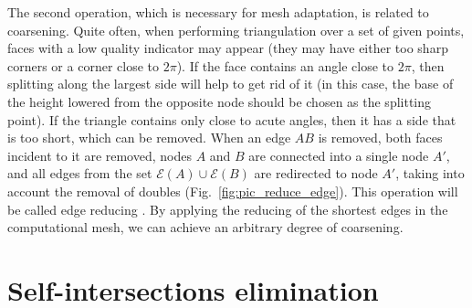 \documentclass[
11pt,%
tightenlines,%
twoside,%
onecolumn,%
nofloats,%
nobibnotes,%
nofootinbib,%
superscriptaddress,%
noshowpacs,%
centertags]%
{revtex4-2}
\begin{document}
The second operation, which is necessary for mesh adaptation, is related to coarsening.
Quite often, when performing triangulation over a set of given points, faces with a low quality indicator may appear (they may have either too sharp corners or a corner close to $2 \pi$).
If the face contains an angle close to $2 \pi$, then splitting along the largest side will help to get rid of it (in this case, the base of the height lowered from the opposite node should be chosen as the splitting point).
If the triangle contains only close to acute angles, then it has a side that is too short, which can be removed.
When an edge $AB$ is removed, both faces incident to it are removed, nodes $A$ and $B$ are connected into a single node $A'$, and all edges from the set $\mathscr{E}(A) \cup \mathscr{E} (B)$ are redirected to node $A'$, taking into account the removal of doubles (Fig.~\ref{fig:pic_reduce_edge}).
This operation will be called edge reducing \cite{Panchal}.
By applying the reducing of the shortest edges in the computational mesh, we can achieve an arbitrary degree of coarsening.


\section{Self-intersections elimination}
\end{document}
